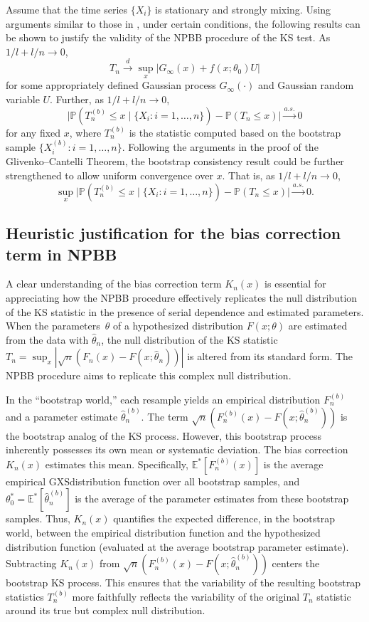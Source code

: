 \documentclass[12pt]{article}
\begin{document}
Assume that the time series $\{X_i\}$ is stationary and
strongly mixing. Using arguments similar to those
in \citet{kunsch1989jackknife}, under certain conditions, the
following results can be shown to
justify the validity of the NPBB procedure of the KS test.
As $1/l+l/n\rightarrow 0$,
\[
  T_n \overset{d}{\rightarrow}
  \sup_x \big\vert G_{\infty}(x)+f(x;\theta_0)U \big\vert
\]
for some appropriately defined Gaussian process $G_{\infty}(\cdot)$
and Gaussian random variable  $U$.
Further,  as $1/l+l/n\rightarrow 0$,
\[
  \big\vert \mathbb{P}(T_n^{(b)}\leq x \mid \{X_i: i = 1, \ldots, n\}) -
  \mathbb{P}(T_n\leq x) \big\vert
  \overset{a.s.}{\rightarrow} 0
\]
for any fixed $x$, where $T_n^{(b)}$ is the statistic computed
based on the bootstrap sample $\{X_i^{(b)}: i = 1, \ldots, n\}$.
Following the arguments in the proof of the Glivenko--Cantelli
Theorem, the bootstrap consistency result could be further
strengthened to allow uniform convergence over $x$. That is,
as $1/l+l/n\rightarrow 0$,
\[
  \sup_x \big \vert
  \mathbb{P}(T_n^{(b)}\leq x \mid \{X_i: i = 1, \ldots, n\}) - \mathbb{P}(T_n\leq x) \big\vert
  \overset{a.s.}{\rightarrow} 0.
\]

\subsection{Heuristic justification for the bias correction term in NPBB}

A clear understanding of the bias correction term $K_n(x)$ is 
essential for appreciating how the NPBB procedure effectively replicates 
the null distribution of the KS statistic in the presence of serial 
dependence and estimated parameters. When the parameters~$\theta$ of a
hypothesized distribution $F(x;\theta)$ are estimated from
the data with $\hat\theta_n$, the null distribution of the KS statistic 
$T_n = \sup_x |\sqrt{n}(F_n(x) - F(x;\hat\theta_n))|$ is altered from its 
standard form. The NPBB procedure aims to replicate this complex null 
distribution.


In the ``bootstrap world,'' each resample yields an empirical distribution 
$F_n^{(b)}$ and a parameter estimate $\hat\theta^{(b)}_n$. The term 
$\sqrt{n}(F_n^{(b)}(x) - F(x;\hat\theta^{(b)}_n))$ is the bootstrap analog of 
the KS process. However, this bootstrap process inherently possesses its own 
mean or systematic deviation. The bias correction $K_n(x)$
estimates this mean.
Specifically, $\mathbb{E}^*[F_n^{(b)}(x)]$ is the average empirical
GXSdistribution function over all bootstrap samples, and
$\theta^*_0 = \mathbb{E}^*[\hat\theta^{(b)}_n]$ is the average of 
the parameter estimates from these bootstrap samples. Thus,
$K_n(x)$ quantifies 
the expected difference, in the bootstrap world, between the empirical
distribution function and the hypothesized distribution function
(evaluated at the average bootstrap parameter estimate).
Subtracting $K_n(x)$ from
$\sqrt{n}(F_n^{(b)}(x) - F(x;\hat\theta^{(b)}_n))$ centers the 
bootstrap KS process. This ensures that the variability of the resulting 
bootstrap statistics $T_n^{(b)}$ more faithfully reflects the variability of 
the original $T_n$ statistic around its true but complex null
distribution.
\end{document}

